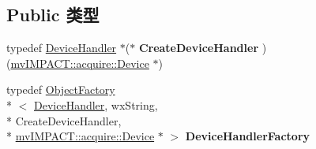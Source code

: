 \subsection*{Public 类型}
\begin{DoxyCompactItemize}
\item 
\hypertarget{class_device_configure_frame_a4ba2a2797803ac5d2baa38244f08fffc}{typedef \hyperlink{class_device_handler}{Device\+Handler} $\ast$($\ast$ {\bfseries Create\+Device\+Handler} )(\hyperlink{classmv_i_m_p_a_c_t_1_1acquire_1_1_device}{mv\+I\+M\+P\+A\+C\+T\+::acquire\+::\+Device} $\ast$)}\label{class_device_configure_frame_a4ba2a2797803ac5d2baa38244f08fffc}

\item 
\hypertarget{class_device_configure_frame_ae1f192b2536b257691d5594ad47cd72d}{typedef \hyperlink{class_object_factory}{Object\+Factory}\\*
$<$ \hyperlink{class_device_handler}{Device\+Handler}, wx\+String, \\*
Create\+Device\+Handler, \\*
\hyperlink{classmv_i_m_p_a_c_t_1_1acquire_1_1_device}{mv\+I\+M\+P\+A\+C\+T\+::acquire\+::\+Device} $\ast$ $>$ {\bfseries Device\+Handler\+Factory}}\label{class_device_configure_frame_ae1f192b2536b257691d5594ad47cd72d}

\end{DoxyCompactItemize}
